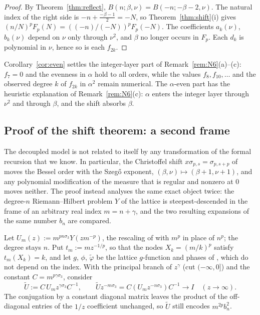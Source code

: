 \begin{proof}
By Theorem~\ref{thm:reflect}, $B(n;\beta,\nu)=B(-n;-\beta-2,\nu)$. The natural index of the right side is
$-n+\frac{-\beta-1}2=-N$, so Theorem~\ref{thm:shift}(i) gives $(n/N)^pF_p(N)=((-n)/(-N))^pF_p(-N)$. The coefficients $a_k(\nu)$,
$b_k(\nu)$ depend on $\nu$ only through $\nu^2$, and $\beta$ no longer occurs in $F_p$. Each $d_k$ is polynomial in $\nu$, hence
so is each $f_{2k}$.
\end{proof}

Corollary~\ref{cor:even} settles the integer-layer part of Remark~\ref{rem:N6}(a)--(c): $f_7=0$ and the evenness in $\alpha$ hold to
all orders, while the values $f_8,f_{10},\dots$ and the observed degree $k$ of $f_{2k}$ in $\alpha^2$ remain numerical. The $\alpha$-even
part has the heuristic explanation of Remark~\ref{rem:N6}(c): $\alpha$ enters the integer layer through $\nu^2$ and through $\beta$,
and the shift absorbs $\beta$.

\subsection{Proof of the shift theorem: a second frame}\label{sec:shift-proof}
The decoupled model is not related to itself by any transformation of the formal recursion that we know. In particular,
the Christoffel shift $x\sigma_{p,s}=\sigma_{p,s+p}$ of \cite{PaperII} moves the Bessel order with the Szeg\H{o} exponent,
$(\beta,\nu)\mapsto(\beta+1,\nu+1)$, and any polynomial modification of the measure that is regular and nonzero at $0$ moves
neither. The proof instead analyses the same exact object twice: the degree-$n$ Riemann--Hilbert problem $Y$ of the lattice
is steepest-descended in the frame of an arbitrary real index $m=n+\gamma$, and the two resulting expansions of the same
number $b_n$ are compared.

Let $U_m(z):=m^{pn\sigma_3}Y(zm^{-p})$, the rescaling of \cite{PaperII} with $m^p$ in place of $n^p$; the degree stays $n$. Put
$t_m:=mz^{-1/p}$, so that the nodes $X_k=(m/k)^p$ satisfy $t_m(X_k)=k$, and let $g$, $\phi$, $\tilde\varphi$ be the lattice
$g$-function and phases of \cite{PaperII}, which do not depend on the index. With the principal branch of $z^\gamma$ (cut
$(-\infty,0]$) and the constant $C=m^{p\gamma\sigma_3}$, consider
\[
  \tilde U:=C\,U_mz^{\gamma\sigma_3}C^{-1},\qquad \tilde Uz^{-m\sigma_3}=C(U_mz^{-n\sigma_3})C^{-1}\to I\quad(z\to\infty).
\]
The conjugation by a constant diagonal matrix leaves the product of the off-diagonal entries of the $1/z$ coefficient unchanged,
so $\tilde U$ still encodes $m^{2p}b_n^2$.

